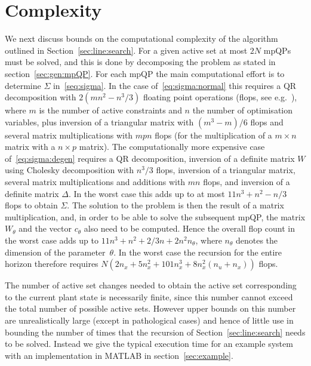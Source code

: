 \section{Complexity}\label{sec:complexity}
We next discuss bounds on the computational complexity of the algorithm outlined in Section~\ref{sec:line:search}.
For a given active set at most $2N$ mpQPs must be solved, and this is done by decomposing the
problem as stated in section~\ref{sec:gen:mpQP}.  For each mpQP the main computational effort is to
determine $\Sigma$ in~\eqref{seq:sigma}. In the case of~\eqref{eq:sigma:normal} this requires a QR
decomposition with $2(mn^2-n^3/3)$ floating point operations (flops, see e.g.~\cite{Golub:1996}), 
where $m$ is the number of active constraints and $n$ the number of
optimisation variables, plus inversion of a triangular matrix with $(m^3-m)/6$ flops and several matrix
multiplications with $mpn$ flops (for the multiplication of a $m\times n$ matrix with a $n\times p$
matrix). The computationally more expensive case of~\eqref{eq:sigma:degen} requires a QR decomposition,
inversion of a definite matrix $W$ using Cholesky decomposition with $n^3/3$ flops, inversion of a triangular
matrix, several matrix multiplications and additions with $mn$ flops, and inversion of a definite matrix
$\Delta$. In the worst case this adds up to at most $11n^3+n^2-n/3$ flops to obtain $\Sigma$. The solution to
the problem is then the result of a matrix multiplication, and, in order to be able to solve the subsequent
mpQP, the matrix $W_\theta$ and the vector $c_\theta$ also need to be computed. Hence the overall flop count
in the worst case adds up to $11n^3+n^2+2/3n+2n^2 n_\theta$, where $n_\theta$ denotes the dimension of the
parameter~$\theta$. 
In the worst case the
recursion for the entire horizon therefore requires $N(2 n_x+5 n_x^2+101 n_x^3+8 n_x^2 (n_u+n_x))$ flops.

The number of active set changes needed to obtain the active set corresponding to the current plant state
is necessarily finite, since this number cannot exceed the total number of possible active sets. However upper
bounds on this number are unrealistically large (except in pathological cases) and hence of little use in bounding the number of times that the recursion of
Section~\ref{sec:line:search} needs to be solved. Instead we give the typical execution time for an example
system with an implementation in MATLAB  in section~\ref{sec:example}.



